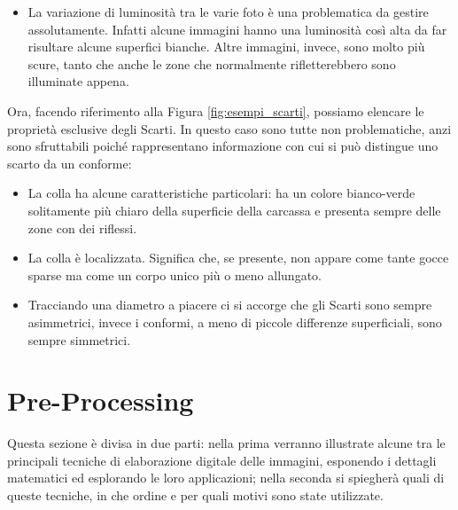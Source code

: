 \begin{itemize}

  \item La variazione di luminosità tra le varie foto è una problematica da gestire assolutamente.
    Infatti alcune immagini hanno una luminosità così alta da far risultare alcune superfici bianche.
    Altre immagini, invece, sono molto più scure, tanto che anche le zone che normalmente rifletterebbero sono illuminate appena.

\end{itemize}

Ora, facendo riferimento alla Figura \ref{fig:esempi_scarti}, possiamo elencare le proprietà esclusive degli Scarti.
In questo caso sono tutte non problematiche, anzi sono sfruttabili poiché rappresentano informazione con cui si può distingue uno scarto da un conforme:
\begin{itemize}
  \item La colla ha alcune caratteristiche particolari: ha un colore bianco-verde solitamente più chiaro della superficie della carcassa e presenta sempre delle zone con dei riflessi.

  \item La colla è localizzata.
    Significa che, se presente, non appare come tante gocce sparse ma come un corpo unico più o meno allungato.

  \item Tracciando una diametro a piacere ci si accorge che gli Scarti sono sempre asimmetrici, invece i conformi, a meno di piccole differenze superficiali, sono sempre simmetrici.

\end{itemize}



\clearpage
\section{Pre-Processing}
Questa sezione è divisa in due parti: nella prima verranno illustrate alcune tra le principali tecniche di elaborazione digitale delle immagini, esponendo i dettagli matematici ed esplorando le loro applicazioni; nella seconda si spiegherà quali di queste tecniche, in che ordine e per quali motivi sono state utilizzate.

